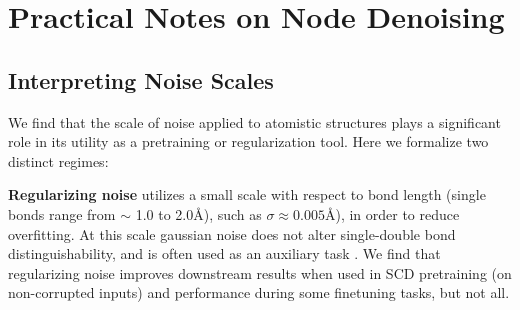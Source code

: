 


\section{Practical Notes on Node Denoising }
\label{denoising_details}

\subsection{Interpreting Noise Scales} 
We find that the scale of noise applied to atomistic structures plays a significant role in its utility as a pretraining or regularization tool. Here we formalize two distinct regimes:

\textbf{Regularizing noise} utilizes a small scale with respect to bond length (single bonds range from $\sim$ 1.0 to 2.0\AA ), such as $\sigma \approx 0.005\text{\AA}$), in order to reduce overfitting. At this scale gaussian noise does not alter single-double bond distinguishability, and is often used as an auxiliary task \cite{NoisyNodes_Godwin2022,Equiformer1_Liao2022, EquiformerV2_Liao2023}. We find that regularizing noise improves downstream results when used in SCD pretraining (on non-corrupted inputs) and performance during some finetuning tasks, but not all.


